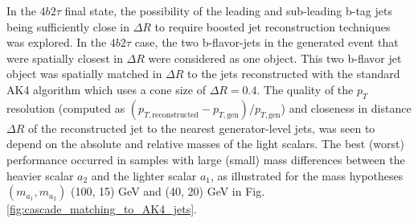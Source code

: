 In the $4b2\tau$ final state, the possibility of the leading and sub-leading b-tag jets being sufficiently close in $\Delta R$ to require boosted jet reconstruction techniques was explored. In the $4b2\tau$ case, the two b-flavor-jets in the generated event that were spatially closest in $\Delta R$ were considered as one object. This two b-flavor jet object was spatially matched in $\Delta R$ to the jets reconstructed with the standard AK4 algorithm which uses a cone size of $\Delta R = 0.4$. The quality of the $p_{T}$ resolution (computed as $(p_{T, \text{reconstructed}} - p_{T, \text{gen}})/ p_{T, \text{gen}}$) and closeness in distance $\Delta R$ of the reconstructed jet to the nearest generator-level jets, was seen to depend on the absolute and relative masses of the light scalars. The best (worst) performance occurred in samples with large (small) mass differences between the heavier scalar $a_2$ and the lighter scalar $a_1$, as illustrated for the mass hypotheses $(m_{a_1}, m_{a_2})$ (100, 15) GeV and (40, 20) GeV in Fig. \ref{fig:cascade_matching_to_AK4_jets}.


